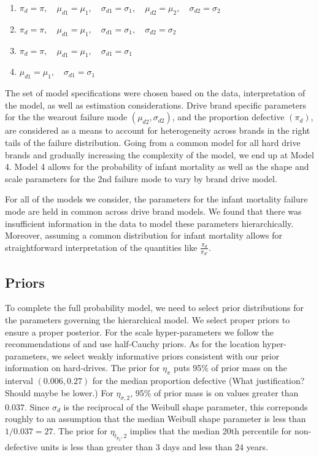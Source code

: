 \documentclass[12pt]{article}
\begin{document}
\begin{enumerate}
\item $\pi_{d} = \pi,\quad \mu_{d1} = \mu_1,\quad \sigma_{d1}=\sigma_1,\quad \mu_{d2} = \mu_2,\quad \sigma_{d2} = \sigma_2$
\item $\pi_{d} = \pi,\quad \mu_{d1} = \mu_1,\quad \sigma_{d1}=\sigma_1,\quad \sigma_{d2} = \sigma_2$
\item $\pi_{d} = \pi,\quad \mu_{d1} = \mu_1,\quad \sigma_{d1}=\sigma_1$
\item $\mu_{d1} = \mu_1,\quad \sigma_{d1}=\sigma_1$
\end{enumerate}

The set of model specifications were chosen based on the data, interpretation of the model, as well as estimation considerations. Drive brand specific parameters for the the wearout failure mode $(\mu_{d2},\sigma_{d2})$, and the proportion defective $(\pi_d)$, are considered as a means to account for heterogeneity across brands in the right tails of the failure distribution.  Going from a common model for all hard drive brands and gradually increasing the complexity of the model, we end up at Model 4.  Model 4 allows for the probability of infant mortality as well as the shape and scale parameters for the 2nd failure mode to vary by brand drive model.

For all of the models we consider, the parameters for the infant mortality failure mode are held in common across drive brand models. We found that there was insufficient information in the data to model these parameters hierarchically.  Moreover, assuming a common distribution for infant mortality allows for straightforward interpretation of the quantities like $\frac{\pi_{d}}{\pi_{d'}}$. 

\subsection{Priors}
To complete the full probability model, we need to select prior distributions for the parameters governing the hierarchical model. We select proper priors to ensure a proper posterior. For the scale hyper-parameters we follow the recommendations of \citet{gelman2014bayesian} and use half-Cauchy priors. As for the location hyper-parameters, we select weakly informative priors consistent with our prior information on hard-drives. The prior for $\eta_\pi$ puts 95\% of prior mass on the interval $(0.006, 0.27)$ for the median proportion defective (What justification? Should maybe be lower.) For $\eta_{\sigma, 2}$, 95\% of prior mass is on values greater than $0.037$. Since $\sigma_d$ is the reciprocal of the Weibull shape parameter, this correponds roughly to an assumption that the median Weibull shape parameter is less than $1/0.037 = 27$. The prior for $\eta_{t_{p_2},2}$ implies that the median 20th percentile for non-defective units is less than greater than 3 days and less than 24 years.
\end{document}

